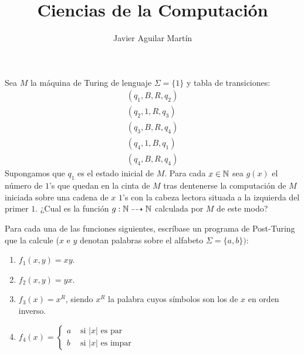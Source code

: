 \documentclass[twoside]{article}
\begin{document}
\title{Ciencias de la Computación}

\author{Javier Aguilar Martín}
\maketitle

\begin{ejercicio}{1}
Sea $M$ la máquina de Turing de lenguaje $Σ = \{1\}$ y tabla de transiciones:
\begin{align*}
	(q_1,B,R,q_2)\\
	(q_2,1,R,q_3)\\
	(q_3,B,R,q_4)\\
	(q_4,1,B,q_1)\\
	(q_4,B,R,q_4)
\end{align*}
Supongamos que $q_1$ es el estado inicial de $M$. Para cada $x \in \mathbb{N}$ sea $g(x)$ el número de $1$'s que quedan en la cinta de $M$ tras dentenerse la computación de $M$ iniciada sobre una cadena de $x$ $1$'s con la cabeza lectora situada a la izquierda del primer $1$. ¿Cual es la función $g : \mathbb{N} \dashrightarrow \mathbb{N}$ calculada por $M$ de este modo?
\end{ejercicio}

\newpage

\begin{ejercicio}{2}
Para cada una de las funciones siguientes, escríbase un programa de Post-Turing que la calcule ($x$ e $y$ denotan palabras sobre el alfabeto $Σ = \{a,b\})$:
\begin{enumerate}
	\item $f_1(x,y)=xy$.
	\item $f_2(x,y)=yx$.
	\item $f_3(x) = x^R$, siendo $x^R$ la palabra cuyos símbolos son los de $x$ en orden inverso.
	\item $f_4(x) = \begin{cases}
		a &\text{ si }|x|\text{ es par}\\
		b &\text{ si }|x|\text{ es impar}
	\end{cases}$
\end{enumerate}
\end{ejercicio}

\newpage
\end{document}
